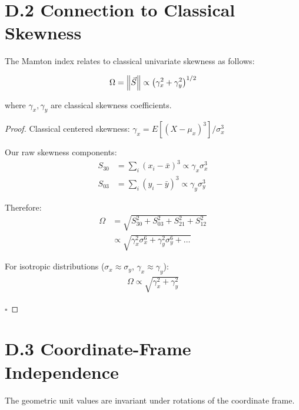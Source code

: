 \section{D.2 Connection to Classical Skewness}

\begin{theorem}
The Mamton index relates to classical univariate skewness as follows:

\begin{align}
    \Omega = \left\lVert\vec{S}\right\rVert \propto \left( \gamma_x^2 + \gamma_y^2 \right)^{1/2}
\end{align}

where $\gamma_x, \gamma_y$ are classical skewness coefficients.
\end{theorem}

\begin{proof}
Classical centered skewness: $\gamma_x = E[(X - \mu_x)^3]/\sigma_x^3$

Our raw skewness components:
\begin{align}
    S_{30} &= \sum_i (x_i - \bar{x})^3 \propto \gamma_x \sigma_x^3 \\
    S_{03} &= \sum_i (y_i - \bar{y})^3 \propto \gamma_y \sigma_y^3
\end{align}

Therefore:
\begin{align}
    \Omega &= \sqrt{S_{30}^2 + S_{03}^2 + S_{21}^2 + S_{12}^2} \\
    &\propto \sqrt{\gamma_x^2 \sigma_x^6 + \gamma_y^2 \sigma_y^6 + \ldots}
\end{align}

For isotropic distributions ($\sigma_x \approx \sigma_y$, $\gamma_x \approx \gamma_y$):
\begin{align}
    \Omega \propto \sqrt{\gamma_x^2 + \gamma_y^2}
\end{align}

$\square$
\end{proof}

\section{D.3 Coordinate-Frame Independence}

\begin{theorem}
The geometric unit values are invariant under rotations of the coordinate frame.
\end{theorem}

